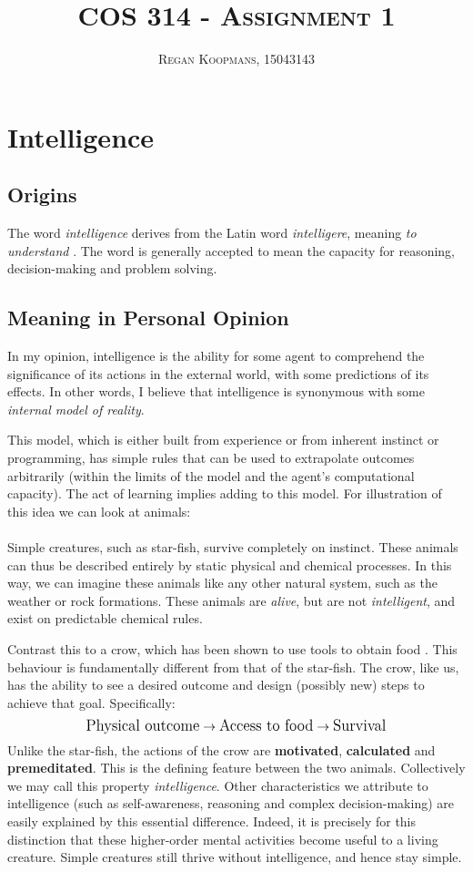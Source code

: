\documentclass[10pt,a4paper]{article}
\author{\textsc{Regan Koopmans, 15043143}}
\title{\textsc{COS 314 - Assignment 1}}
\begin{document}
		
	\maketitle
		
		\section{Intelligence}
			\subsection{Origins}
				The word \textsl{intelligence} derives from the Latin word \textsl{intelligere}, meaning \textsl{to understand} \cite{etymonline2017}. The word is generally accepted to mean the capacity for reasoning, decision-making and problem solving.
		
			\subsection{Meaning in Personal Opinion}
		
				In my opinion, intelligence is the ability for some agent to comprehend the significance of its actions in the external world, with some predictions of its effects. In other words, I believe that intelligence is synonymous with some \textsl{internal model of reality}. 
				
				This model, which is either built from experience or from inherent instinct or programming, has simple rules that can be used to extrapolate outcomes arbitrarily (within the limits of the model and the agent's computational capacity). The act of learning implies adding to this model. For illustration of this idea we can look at animals:
				\\\\
				Simple creatures, such as star-fish, survive completely on instinct. These animals can thus be described entirely by static physical and chemical processes. In this way, we can imagine these animals like any other natural system, such as the weather or rock formations. These animals are \textsl{alive}, but are not \textsl{intelligent}, and exist on predictable chemical rules. 
				
				Contrast this to a crow, which has been shown to use tools to obtain food \cites{atlantic2017}. This behaviour is fundamentally different from that of the star-fish. The crow, like us, has the ability to see a desired outcome and design (possibly new) steps to achieve that goal. Specifically:
				\medskip
				\[
				\text{\large Physical outcome}\rightarrow\text{\large Access to food}\rightarrow\text{\large Survival}
				\]
				Unlike the star-fish, the actions of the crow are \textbf{motivated}, \textbf{calculated} and \textbf{premeditated}. This is the defining feature between the two animals. Collectively we may call this property \textsl{intelligence}. Other characteristics we attribute to intelligence (such as self-awareness, reasoning and complex decision-making) are easily explained by this essential difference. Indeed, it is precisely for this distinction that these higher-order mental activities become useful to a living creature. Simple creatures still thrive without intelligence, and hence stay simple. 
				
\end{document}
